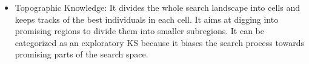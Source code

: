 \documentclass{llncs}
\begin{document}
\begin{itemize}
	\item Topographic Knowledge: It divides the whole search landscape into cells and keeps tracks of the best individuals in each cell. It aims at digging into promising regions to divide them into smaller subregions. It can be categorized as an exploratory KS because it biases the search process towards promising parts of the search space. %
\end{itemize}
\end{document}
